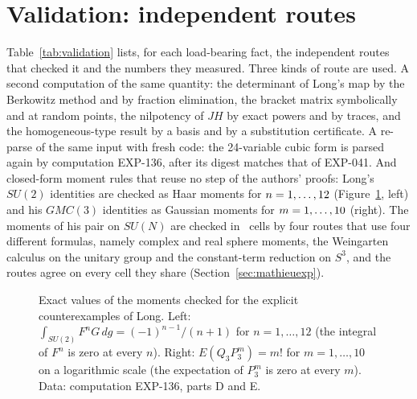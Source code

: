 \documentclass[11pt]{article}
\theoremstyle{remark}
\newcommand{\EXP}[1]{\mbox{EXP-#1}}
\begin{document}
\section{Validation: independent routes}\label{sec:validation}

Table~\ref{tab:validation} lists, for each load-bearing fact, the independent routes that checked it and the numbers they measured. Three kinds of route are used. A second computation of the same quantity: the determinant of Long's map by the Berkowitz method and by fraction elimination, the bracket matrix symbolically and at random points, the nilpotency of $JH$ by exact powers and by traces, and the homogeneous-type result by a basis and by a substitution certificate. A re-parse of the same input with fresh code: the 24-variable cubic form is parsed again by computation \EXP{136}, after its digest matches that of \EXP{041}. And closed-form moment rules that reuse no step of the authors' proofs: Long's $SU(2)$ identities are checked as Haar moments for $n=1,\dots,12$ (Figure~\ref{fig:moments}, left) and his $GMC(3)$ identities as Gaussian moments for $m=1,\dots,10$ (right). The moments of his pair on $SU(N)$ are checked in \nmccells\ cells by four routes that use four different formulas, namely complex and real sphere moments, the Weingarten calculus on the unitary group and the constant-term reduction on $S^3$, and the routes agree on every cell they share (Section~\ref{sec:mathieuexp}).



\begin{figure}[t]
\centering

\caption{Exact values of the moments checked for the explicit counterexamples of Long. Left: $\int_{SU(2)}F^nG\,dg=(-1)^{n-1}/(n+1)$ for $n=1,\dots,12$ (the integral of $F^n$ is zero at every $n$). Right: $E(Q_3P_3^m)=m!$ for $m=1,\dots,10$ on a logarithmic scale (the expectation of $P_3^m$ is zero at every $m$). Data: computation \EXP{136}, parts D and E.}
\label{fig:moments}
\end{figure}
\end{document}
